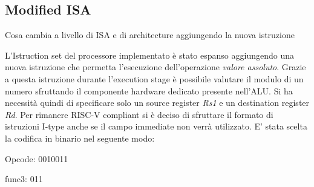 \subsection{Modified ISA}
Cosa cambia a livello di ISA e di architecture aggiungendo la nuova istruzione

L'Istruction set del processore implementato è stato espanso aggiungendo una nuova istruzione che permetta l'esecuzione dell'operazione \textit{valore assoluto}. Grazie a questa istruzione durante l'execution stage è possibile valutare il modulo di un numero sfruttando il componente hardware dedicato presente nell'ALU. Si ha necessità quindi di specificare solo un source register \textit{Rs1} e un destination register \textit{Rd}. Per rimanere RISC-V compliant si è deciso di sfruttare il formato di istruzioni I-type anche se il campo immediate non verrà utilizzato.
E' stata scelta la codifica in binario nel seguente modo:
\begin{description}
    \item{Opcode:} 0010011
    \item{func3:} 011
\end{description}

